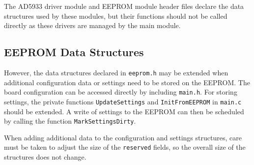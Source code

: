 The AD5933 driver module and EEPROM module header files declare the data structures used by these modules, but their
functions should not be called directly as these drivers are managed by the main module.

\subsection{EEPROM Data Structures}

However, the data structures declared in \verb!eeprom.h! may be extended when additional configuration data or settings
need to be stored on the EEPROM. The board configuration can be accessed directly by including \verb!main.h!.
For storing settings, the private functions \verb!UpdateSettings! and \verb!InitFromEEPROM! in \verb!main.c! should
be extended. A write of settings to the EEPROM can then be scheduled by calling the function \verb!MarkSettingsDirty!.

When adding additional data to the configuration and settings structures, care must be taken to adjust the size of the
\verb!reserved! fields, so the overall size of the structures does not change.

